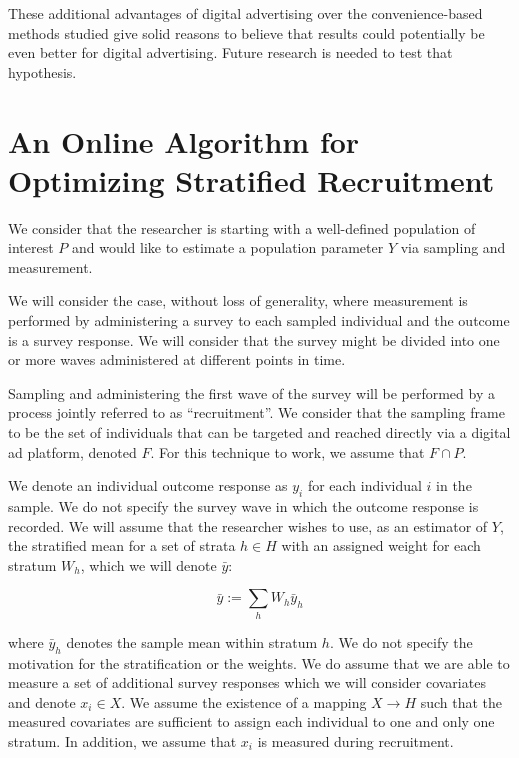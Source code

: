 \documentclass[a4paper,12pt]{article}
\theoremstyle{proposition}
\begin{document}
These additional advantages of digital advertising over the convenience-based methods studied give solid reasons to believe that results could potentially be even better for digital advertising. Future research is needed to test that hypothesis.


\section{An Online Algorithm for Optimizing Stratified Recruitment}


We consider that the researcher is starting with a well-defined population of interest $P$ and would like to estimate a population parameter $Y$ via sampling and measurement.

We will consider the case, without loss of generality, where measurement is performed by administering a survey to each sampled individual and the outcome is a survey response. We will consider that the survey might be divided into one or more waves administered at different points in time.

Sampling and administering the first wave of the survey will be performed by a process jointly referred to as ``recruitment''. We consider that the sampling frame to be the set of individuals that can be targeted and reached directly via a digital ad platform, denoted $F$. For this technique to work, we assume that $F \cap P$.

We denote an individual outcome response as $y_i$ for each individual $i$ in the sample. We do not specify the survey wave in which the outcome response is recorded. We will assume that the researcher wishes to use, as an estimator of $Y$, the stratified mean for a set of strata $h \in H$ with an assigned weight for each stratum $W_h$, which we will denote $\bar{y}$:

$$
\bar{y} := \sum_h W_h\bar{y}_h
$$

where $\bar{y}_h$ denotes the sample mean within stratum $h$. We do not specify the motivation for the stratification or the weights. We do assume that we are able to measure a set of additional survey responses which we will consider covariates and denote $x_i \in X$. We assume the existence of a mapping $X \rightarrow H$ such that the measured covariates are sufficient to assign each individual to one and only one stratum. In addition, we assume that $x_i$ is measured during recruitment.


\end{document}
